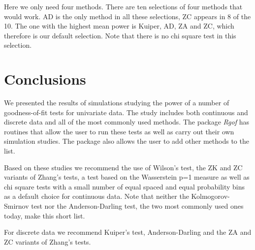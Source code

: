 \documentclass[]{svjour3}
\begin{document}
Here we only need four methods. There are ten selections of four methods that would work. AD is the only method in all
these selections, ZC appears in 8 of the 10. The one with the highest
mean power is Kuiper, AD, ZA and ZC, which therefore is our default
selection. Note that there is no chi square test in this selection.

\section{Conclusions}

We presented the results of simulations studying the power of a number of goodness-of-fit tests for univariate data. The study includes both continuous and discrete data and all of the most commonly used methods. The  package \emph{Rgof} has routines that allow the user to run these tests as well as carry out their own simulation studies. The package also allows the user to add other methods to the list.

Based on these studies we recommend the use of Wilson's test, the ZK and ZC variants of Zhang's tests, a test based on the Wasserstein p=1 measure as well as chi square tests with a small number of equal spaced and equal probability bins as a default choice for continuous data. Note that neither the Kolmogorov-Smirnov test nor the Anderson-Darling test, the two most commonly used ones today, make this short list.

For discrete data we recommend Kuiper's test, Anderson-Darling and the ZA and ZC variants of Zhang's tests.





\end{document}
